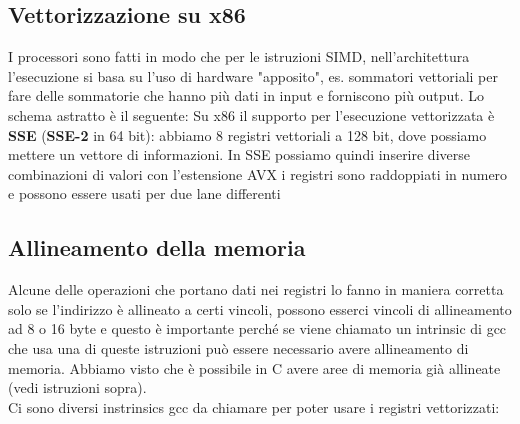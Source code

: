 \documentclass[12pt, oneside]{extbook}
\begin{document}
\subsection{Vettorizzazione su x86}
I processori sono fatti in modo che per le istruzioni SIMD, nell'architettura l'esecuzione si basa su l'uso di hardware "apposito", es. sommatori vettoriali per fare delle sommatorie che hanno più dati in input e forniscono più output. Lo schema astratto è il seguente:
Su x86 il supporto per l'esecuzione vettorizzata è \textbf{SSE} (\textbf{SSE-2} in 64 bit): abbiamo 8 registri vettoriali a 128 bit, dove possiamo mettere un vettore di informazioni. In SSE possiamo quindi inserire diverse combinazioni di valori
con l'estensione AVX i registri sono raddoppiati in numero e possono essere usati per due lane differenti
\subsection{Allineamento della memoria}
Alcune delle operazioni che portano dati nei registri lo fanno in maniera corretta solo se l'indirizzo è allineato a certi vincoli, possono esserci vincoli di allineamento ad 8 o 16 byte e questo è importante perché se viene chiamato un intrinsic di gcc che usa una di queste istruzioni può essere necessario avere allineamento di memoria. Abbiamo visto che è possibile in C avere aree di memoria già allineate (vedi istruzioni sopra).\\ Ci sono diversi instrinsics gcc da chiamare per poter usare i registri vettorizzati:
\end{document}

